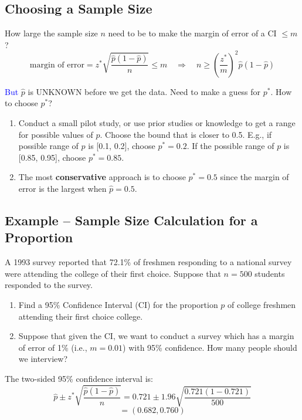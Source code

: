 \documentclass[14pt]{extarticle}
\begin{document}
\subsection*{Choosing a Sample Size}

How large the sample size \(n\) need to be to make the margin of error of a CI \(\leq m\)?
\[
\text{margin of error} = z^* \sqrt{\frac{\hat{p}(1-\hat{p})}{n}} \leq m 
\quad \Rightarrow \quad n \geq \left(\frac{z^*}{m}\right)^2 \hat{p}(1-\hat{p})
\]

\noindent \textcolor{blue}{But} \(\hat{p}\) is UNKNOWN before we get the data. Need to make a guess for \(p^*\). How to choose \(p^*\)?
\begin{enumerate}
    \item Conduct a small pilot study, or use prior studies or knowledge to get a range for possible values of \(p\). Choose the bound that is closer to 0.5. E.g., if possible range of \(p\) is [0.1, 0.2], choose \(p^* = 0.2\). 
    If the possible range of \(p\) is [0.85, 0.95], choose \(p^* = 0.85\).
    \item The most \textbf{conservative} approach is to choose \(p^* = 0.5\) since the margin of error is the largest when \(\hat{p} = 0.5\).
\end{enumerate}

\subsection*{Example – Sample Size Calculation for a Proportion}

A 1993 survey reported that 72.1\% of freshmen responding to a national survey were attending the college of their first choice. Suppose that \(n = 500\) students responded to the survey.

\begin{enumerate}
    \item Find a 95\% Confidence Interval (CI) for the proportion \(p\) of college freshmen attending their first choice college.
    \item Suppose that given the CI, we want to conduct a survey which has a margin of error of 1\% (i.e., \(m = 0.01\)) with 95\% confidence. How many people should we interview?
\end{enumerate}

The two-sided 95\% confidence interval is:
\[
\hat{p} \pm z^* \sqrt{\frac{\hat{p}(1 - \hat{p})}{n}} = 0.721 \pm 1.96 \sqrt{\frac{0.721(1 - 0.721)}{500}}
\]
\[
= (0.682, 0.760)
\]
\end{document}
